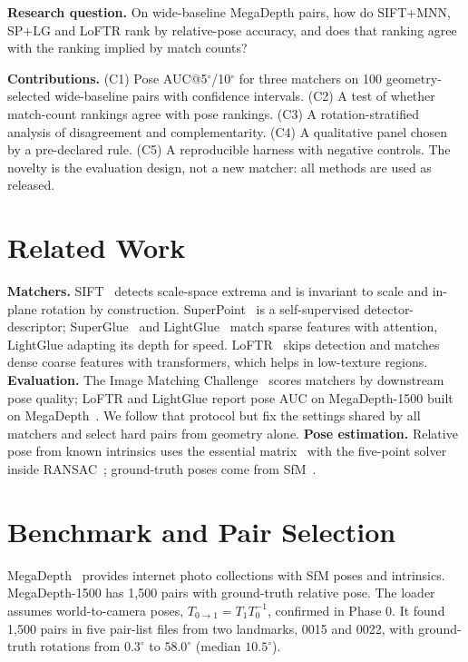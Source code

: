 \documentclass[10pt,twocolumn,letterpaper]{article}
\newcommand{\dg}{^{\circ}}
\begin{document}
\noindent\textbf{Research question.} On wide-baseline MegaDepth pairs, how do SIFT+MNN, SP+LG and LoFTR rank by relative-pose accuracy, and does that ranking agree with the ranking implied by match counts?

\noindent\textbf{Contributions.} (C1) Pose AUC@5$\dg$/10$\dg$ for three matchers on 100 geometry-selected wide-baseline pairs with confidence intervals. (C2) A test of whether match-count rankings agree with pose rankings. (C3) A rotation-stratified analysis of disagreement and complementarity. (C4) A qualitative panel chosen by a pre-declared rule. (C5) A reproducible harness with negative controls. The novelty is the evaluation design, not a new matcher: all methods are used as released.

\section{Related Work}
\textbf{Matchers.} SIFT~\cite{lowe} detects scale-space extrema and is invariant to scale and in-plane rotation by construction. SuperPoint~\cite{superpoint} is a self-supervised detector-descriptor; SuperGlue~\cite{superglue} and LightGlue~\cite{lightglue} match sparse features with attention, LightGlue adapting its depth for speed. LoFTR~\cite{loftr} skips detection and matches dense coarse features with transformers, which helps in low-texture regions.
\textbf{Evaluation.} The Image Matching Challenge~\cite{imc} scores matchers by downstream pose quality; LoFTR and LightGlue report pose AUC on MegaDepth-1500 built on MegaDepth~\cite{megadepth}. We follow that protocol but fix the settings shared by all matchers and select hard pairs from geometry alone.
\textbf{Pose estimation.} Relative pose from known intrinsics uses the essential matrix~\cite{hz} with the five-point solver~\cite{nister} inside RANSAC~\cite{ransac}; ground-truth poses come from SfM~\cite{colmap}.

\section{Benchmark and Pair Selection}
MegaDepth~\cite{megadepth} provides internet photo collections with SfM poses and intrinsics. MegaDepth-1500 has 1,500 pairs with ground-truth relative pose. The loader assumes world-to-camera poses, $T_{0\to1}=T_1T_0^{-1}$, confirmed in Phase 0. It found 1,500 pairs in five pair-list files from two landmarks, 0015 and 0022, with ground-truth rotations from $0.3\dg$ to $58.0\dg$ (median $10.5\dg$).
\end{document}
